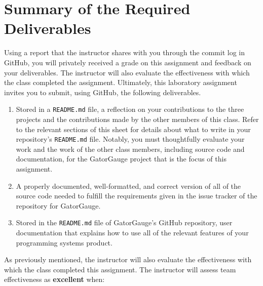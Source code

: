 \documentclass[11pt]{article}
\newcommand{\reflection}{\lstinline{README.md}}
\begin{document}
\section*{Summary of the Required Deliverables}

Using a report that the instructor shares with you through the commit log in GitHub, you will privately received a grade
on this assignment and feedback on your deliverables. The instructor will also evaluate the effectiveness with which the
class completed the assignment. Ultimately, this laboratory assignment invites you to submit, using GitHub, the
following deliverables.

\vspace*{-.5em}

\begin{enumerate}

\setlength{\itemsep}{0in}

\item Stored in a \reflection{} file, a reflection on your contributions to the three projects and the contributions
  made by the other members of this class. Refer to the relevant sections of this sheet for details about what to write
  in your repository's \reflection{} file. Notably, you must thoughtfully evaluate your work and the work of the other
  class members, including source code and documentation, for the GatorGauge project that is the focus of this
  assignment.

\item A properly documented, well-formatted, and correct version of all of the source code needed to fulfill the
  requirements given in the issue tracker of the repository for GatorGauge.

\item Stored in the \reflection{} file of GatorGauge's GitHub repository, user documentation that explains how to use
  all of the relevant features of your programming systems product.

\end{enumerate}

As previously mentioned, the instructor will also evaluate the effectiveness with which the class completed this
assignment. The instructor will assess team effectiveness as {\bf excellent} when:

\vspace*{-.5em}
\end{document}
